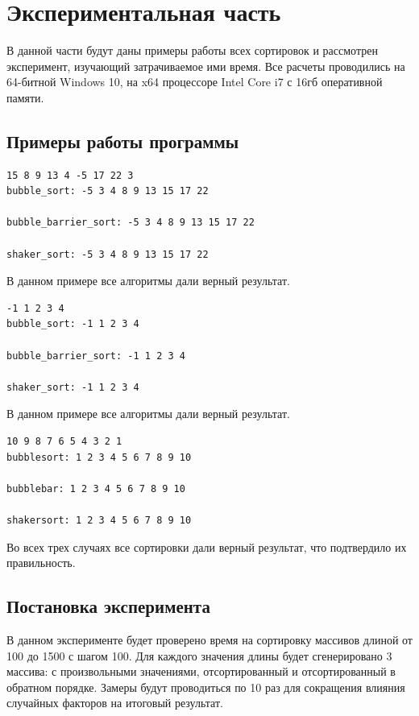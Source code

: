 \documentclass[a4paper, 14pt]{article}
\begin{document}
        \section{Экспериментальная часть}
        В данной части будут даны примеры работы всех сортировок и рассмотрен эксперимент, изучающий затрачиваемое ими время. Все расчеты проводились на 64-битной Windows 10, на x64 процессоре Intel Core i7 с 16гб оперативной памяти.
        \subsection{Примеры работы программы}
		\begin{lstlisting}[label=some-code,caption=Пример работы 1]        
15 8 9 13 4 -5 17 22 3 
bubble_sort: -5 3 4 8 9 13 15 17 22 

bubble_barrier_sort: -5 3 4 8 9 13 15 17 22 

shaker_sort: -5 3 4 8 9 13 15 17 22 

		\end{lstlisting}
		В данном примере все алгоритмы дали верный результат.
		\begin{lstlisting}[label=some-code,caption=Пример работы 2]		
-1 1 2 3 4 
bubble_sort: -1 1 2 3 4 

bubble_barrier_sort: -1 1 2 3 4 

shaker_sort: -1 1 2 3 4 

		\end{lstlisting}
		В данном примере все алгоритмы дали верный результат.
		\begin{lstlisting}[label=some-code,caption=Пример работы 3]		
10 9 8 7 6 5 4 3 2 1 
bubblesort: 1 2 3 4 5 6 7 8 9 10 

bubblebar: 1 2 3 4 5 6 7 8 9 10 

shakersort: 1 2 3 4 5 6 7 8 9 10 
		\end{lstlisting}
		Во всех трех случаях все сортировки дали верный результат, что подтвердило их правильность.
		
		\subsection{Постановка эксперимента}
		\parindent=1cm
		В данном эксперименте будет проверено время на сортировку массивов длиной от 100 до 1500 с шагом 100. Для каждого значения длины будет сгенерировано 3 массива: с произвольными значениями, отсортированный и отсортированный в обратном порядке. Замеры будут проводиться по 10 раз для сокращения влияния случайных факторов на итоговый результат. 
\end{document}
